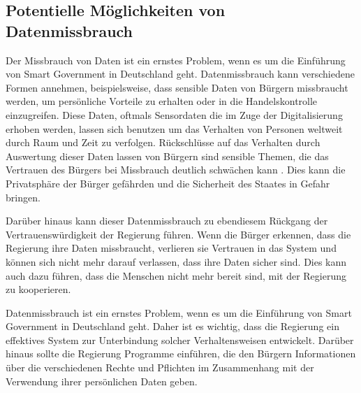 \subsection{Potentielle Möglichkeiten von Datenmissbrauch}
Der Missbrauch von Daten ist ein ernstes Problem, wenn es um die Einführung von Smart Government in Deutschland geht. 
Datenmissbrauch kann verschiedene Formen annehmen, beispielsweise, dass sensible Daten von Bürgern missbraucht werden, um persönliche Vorteile zu erhalten oder in die Handelskontrolle einzugreifen.
Diese Daten, oftmals Sensordaten die im Zuge der Digitalisierung erhoben werden, lassen sich benutzen um das Verhalten von Personen weltweit durch Raum und Zeit zu verfolgen.
Rückschlüsse auf das Verhalten durch Auswertung dieser Daten lassen von Bürgern sind sensible Themen, die das Vertrauen des Bürgers bei Missbrauch deutlich schwächen kann \citep[Vgl.][S.179]{von_Lucke_2016}.
Dies kann die Privatsphäre der Bürger gefährden und die Sicherheit des Staates in Gefahr bringen.
\par
Darüber hinaus kann dieser Datenmissbrauch zu ebendiesem Rückgang der Vertrauenswürdigkeit der Regierung führen. 
Wenn die Bürger erkennen, dass die Regierung ihre Daten missbraucht, verlieren sie Vertrauen in das System und können sich nicht mehr darauf verlassen, dass ihre Daten sicher sind. 
Dies kann auch dazu führen, dass die Menschen nicht mehr bereit sind, mit der Regierung zu kooperieren.
\par
Datenmissbrauch ist ein ernstes Problem, wenn es um die Einführung von Smart Government in Deutschland geht. 
Daher ist es wichtig, dass die Regierung ein effektives System zur Unterbindung solcher Verhaltensweisen entwickelt. 
Darüber hinaus sollte die Regierung Programme einführen, die den Bürgern Informationen über die verschiedenen Rechte und Pflichten im Zusammenhang mit der Verwendung ihrer persönlichen Daten geben.